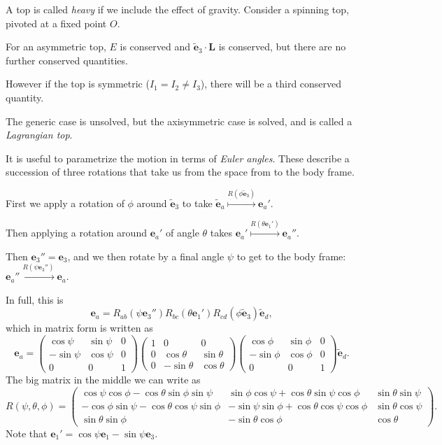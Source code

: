 \documentclass[12pt]{article}
\begin{document}
A top is called \emph{heavy} if we include the effect of gravity. Consider a spinning top, pivoted at a fixed point $O$.

For an asymmetric top, $E$ is conserved and $\mathbf{\tilde e}_3 \cdot \mathbf{L}$ is conserved, but there are no further conserved quantities.

However if the top is symmetric ($I_1 = I_2 \neq I_3$), there will be a third conserved quantity.

The generic case is unsolved, but the axisymmetric case is solved, and is called a \emph{Lagrangian top}.

It is useful to parametrize the motion in terms of \emph{Euler angles}. These describe a succession of three rotations that take us from the space from to the body frame.

First we apply a rotation of $\phi$ around $\mathbf{\tilde e}_3$ to take $\mathbf{\tilde e}_a \overset{R(\phi \mathbf{\tilde e}_3)}{\mapsto} \mathbf{e}_a'$.

Then applying a rotation around $\mathbf{e}_a'$ of angle $\theta$ takes $\mathbf{e}_a' \overset{R(\theta \mathbf{e}_1')}{\mapsto} \mathbf{e}_a''$.

Then $\mathbf{e}_3'' = \mathbf{e}_3$, and we then rotate by a final angle $\psi$ to get to the body frame: $\mathbf{e}_a'' \overset{R(\psi \mathbf{e}_3'')}{\mapsto} \mathbf{e}_a$.

In full, this is
\[
\mathbf{e}_a = R_{ab}(\psi \mathbf{e}_3'')R_{bc}(\theta \mathbf{e}_1') R_{cd}(\phi \mathbf{\tilde e}_3) \mathbf{\tilde e}_d,
\]
which in matrix form is written as
\[
\mathbf{e}_a =
\begin{pmatrix}
	\cos \psi & \sin \psi & 0 \\
	-\sin \psi & \cos \psi & 0 \\
	0 & 0 & 1
\end{pmatrix}
\begin{pmatrix}
	1 & 0 & 0 \\
	0 & \cos \theta & \sin \theta \\
	0 & -\sin \theta & \cos \theta
\end{pmatrix}
\begin{pmatrix}
	\cos \phi & \sin \phi & 0 \\
	-\sin \phi & \cos \phi & 0 \\
	0 & 0 & 1
\end{pmatrix}
\mathbf{\tilde e}_d.
\]
The big matrix in the middle we can write as
\[
	R(\psi, \theta, \phi) =
	\begin{pmatrix}
		\cos \psi \cos \phi - \cos \theta \sin \phi \sin \psi & \sin \phi \cos \psi + \cos \theta \sin \psi \cos \phi & \sin \theta \sin \psi \\
		-\cos \phi \sin \psi - \cos \theta \cos \psi \sin \phi & -\sin \psi \sin \phi + \cos \theta \cos \psi \cos \phi & \sin \theta \cos \psi \\
		\sin \theta \sin \phi & - \sin \theta \cos \phi & \cos \theta
	\end{pmatrix}.
\]
Note that $\mathbf{e}_1' = \cos \psi \mathbf{e}_1 - \sin \psi \mathbf{e}_3$.
\end{document}
